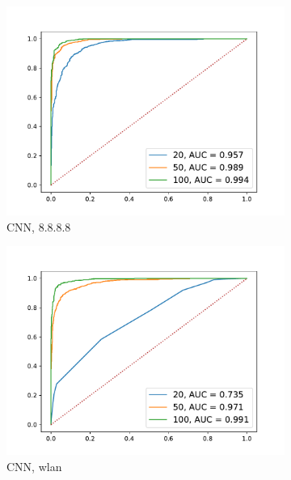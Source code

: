 \documentclass[12pt,a4paper,automark, toc=bib]{scrreprt}
\theoremstyle{definition}
\begin{document}
\begin{figure}
\begin{subfigure}{0.32\linewidth}
					\includegraphics[width=\linewidth]{figures/md5_8.8.8.8_keras.pdf}
					\caption{CNN, 8.8.8.8}
				\end{subfigure}
				\begin{subfigure}{0.32\linewidth}
					\centering
					\includegraphics[width=\linewidth]{figures/md5_wlan_keras.pdf}
					\caption{CNN, wlan}
				\end{subfigure}
				\begin{subfigure}{0.32\linewidth}
					\centering

\end{subfigure}
\end{figure}
\end{document}
